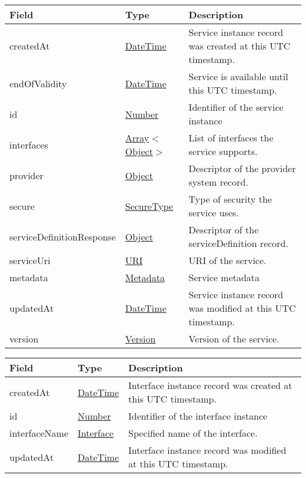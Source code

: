 \documentclass[a4paper]{arrowhead}
\newcommand{\pref}[1]{{\textcolor{ArrowheadGrey}{\hyperref[sec:model:primitives:#1]{#1}}}}
\begin{document}
\begin{table}[ht!]
\begin{tabularx}{\textwidth}{| p{4.25cm} | p{3.5cm} | X |} \hline
\rowcolor{gray!33} Field & Type      & Description \\ \hline
createdAt & \pref{DateTime} & Service instance record was created at this UTC timestamp. \\ \hline
endOfValidity & \pref{DateTime} & Service is available until this UTC timestamp. \\ \hline
id & \pref{Number} & Identifier of the service instance \\ \hline
interfaces & \pref{Array}$<$\pref{Object}$>$     & List of interfaces the service supports. \\ \hline
provider & \pref{Object} & Descriptor of the provider system record. \\ \hline
secure &\pref{SecureType}  & Type of security the service uses. \\ \hline
serviceDefinitionResponse & \pref{Object} & Descriptor of the serviceDefinition record. \\ \hline
serviceUri &\pref{URI}         & URI of the service. \\ \hline
metadata & \pref{Metadata}     & Service metadata \\ \hline
updatedAt & \pref{DateTime} & Service instance record was modified at this UTC timestamp. \\ \hline
version &\pref{Version}     & Version of the service. \\ \hline
\end{tabularx}
\end{table}


\begin{table}[ht!]
\begin{tabularx}{\textwidth}{| p{4.25cm} | p{3.5cm} | X |} \hline
\rowcolor{gray!33} Field & Type      & Description \\ \hline
createdAt & \pref{DateTime} & Interface instance record was created at this UTC timestamp. \\ \hline
id & \pref{Number} & Identifier of the interface instance \\ \hline
interfaceName &\pref{Interface}  & Specified name of the interface. \\ \hline
updatedAt & \pref{DateTime} & Interface instance record was modified at this UTC timestamp. \\ \hline
\end{tabularx}
\end{table}
\end{document}

